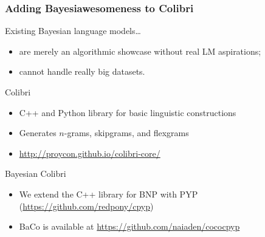 \begin{frame}
    \frametitle{Adding Bayesiawesomeness to Colibri}
    
    Existing Bayesian language models\ldots
        \begin{itemize}
            \item are merely an algorithmic showcase without real LM aspirations;
            \item cannot handle really big datasets.
        \end{itemize}

    \begin{block}{Colibri}
        \begin{itemize}
            \item C++ and Python library for basic linguistic constructions
            \item Generates $n$-grams, skipgrams, and flexgrams
            \item \url{http://proycon.github.io/colibri-core/}
        \end{itemize}
    \end{block}
    \vspace{-0.25cm}
    \begin{block}{Bayesian Colibri}
        \begin{itemize}
            \item We extend the C++ library for BNP with PYP (\url{https://github.com/redpony/cpyp})
            \item BaCo is available at \url{https://github.com/naiaden/cococpyp}
        \end{itemize}
    \end{block}
\end{frame}

